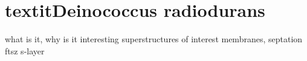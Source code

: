 \chapter{textit{Deinococcus radiodurans}}

\begin{outline}
\1 what is it, why is it interesting
\1 superstructures of interest
    \2 membranes, septation
    \2 ftsz
    \2 s-layer
\end{outline}
